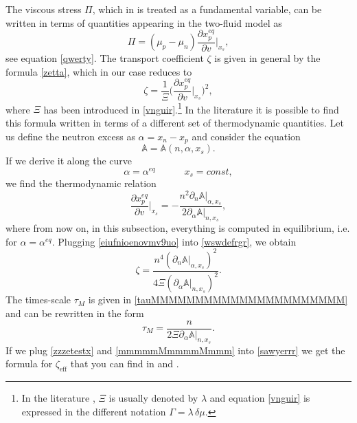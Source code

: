 \documentclass[useAMS,usenatbib,prd,twocolumn,nofootinbib]{revtex4-1}
\newcommand{\spc}{\quad \quad \quad}
\begin{document}
The viscous stress $\Pi$, which in \cite{Israel_Stewart_1979} is treated as a fundamental variable, can be written in terms of quantities appearing in the two-fluid model as
\begin{equation}
\Pi=(\mu_p-\mu_n)\dfrac{\partial x_p^{eq}}{\partial v} \bigg|_{x_s} ,
\end{equation}
see equation \eqref{qwerty}. The transport coefficient $\zeta$ is given in general by the formula \eqref{zetta}, which in our case reduces to
\begin{equation}\label{wswdefrgr}
\zeta = \dfrac{1}{\Xi} \bigg( \dfrac{\partial x_p^{eq}}{\partial v} \bigg|_{x_s} \bigg)^2,
\end{equation}
where $\Xi$ has been introduced in \eqref{vnguir}.\footnote{
    In the literature \citep{Sawyer_Bulk1989,Gusakov2007}, $\Xi$ is usually denoted by $\lambda$ and equation \eqref{vnguir} is expressed in the different notation $\Gamma = \lambda \, \delta \mu$. } 
In the literature it is possible to find this formula written in terms of a different set of thermodynamic quantities. Let us define the neutron excess as $\alpha = x_n-x_p$ and consider the equation
\begin{equation}
\mathbb{A} = \mathbb{A}(n,\alpha,x_s).
\end{equation}
If we derive it along the curve
\begin{equation}
\alpha=\alpha^{eq} \spc x_s = const ,
\end{equation}
we find the thermodynamic relation
\begin{equation}\label{eiufnioenovmv9uo}
\dfrac{\partial x_p^{eq}}{\partial v} \bigg|_{x_s} = -\dfrac{n^2 \partial_n \mathbb{A}|_{\alpha,x_s}}{2\partial_\alpha \mathbb{A}|_{n,x_s}}, 
\end{equation}
where from now on, in this subsection, everything is computed in equilibrium, i.e. for $\alpha= \alpha^{eq}$. Plugging \eqref{eiufnioenovmv9uo} into \eqref{wswdefrgr}, we obtain
\begin{equation}\label{zzzetestx}
\zeta = \dfrac{n^4 ( \partial_n \mathbb{A}|_{\alpha,x_s})^2}{4\Xi( \partial_\alpha \mathbb{A}|_{n,x_s})^2}     . 
\end{equation}
The times-scale $\tau_M$ is given in \eqref{tauMMMMMMMMMMMMMMMMMMMMMM} and can be rewritten in the form
\begin{equation}\label{mmmmmMmmmmMmmm}
\tau_M = \dfrac{n}{2\Xi \partial_\alpha \mathbb{A}|_{n,x_s}}.
\end{equation}
If we plug \eqref{zzzetestx} and \eqref{mmmmmMmmmmMmmm} into \eqref{sawyerrr} we get the formula for $\zeta_{\textrm{eff}}$ that you can find in \cite{Sawyer_Bulk1989} and \cite{Haensel_Bulk_Urca}.
\end{document}
